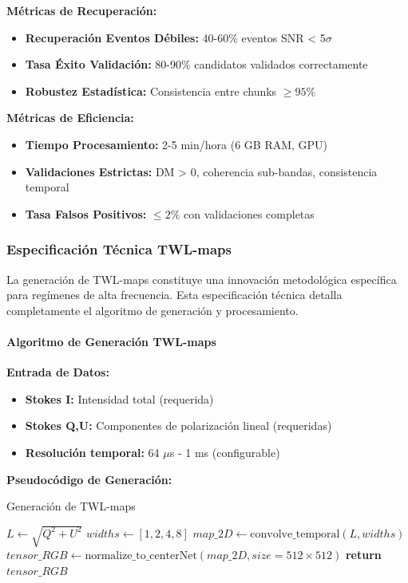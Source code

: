 \textbf{Métricas de Recuperación:}
\begin{itemize}
\item \textbf{Recuperación Eventos Débiles:} 40-60\% eventos SNR < 5$\sigma$
\item \textbf{Tasa Éxito Validación:} 80-90\% candidatos validados correctamente
\item \textbf{Robustez Estadística:} Consistencia entre chunks $\geq 95\%$
\end{itemize}

\textbf{Métricas de Eficiencia:}
\begin{itemize}
\item \textbf{Tiempo Procesamiento:} 2-5 min/hora (6 GB RAM, GPU)
\item \textbf{Validaciones Estrictas:} DM > 0, coherencia sub-bandas, consistencia temporal
\item \textbf{Tasa Falsos Positivos:} $\leq 2\%$ con validaciones completas
\end{itemize}

\subsubsection{Especificación Técnica TWL-maps}

La generación de TWL-maps constituye una innovación metodológica específica para regímenes de alta frecuencia. Esta especificación técnica detalla completamente el algoritmo de generación y procesamiento.

\paragraph{Algoritmo de Generación TWL-maps}

\textbf{Entrada de Datos:}
\begin{itemize}
\item \textbf{Stokes I:} Intensidad total (requerida)
\item \textbf{Stokes Q,U:} Componentes de polarización lineal (requeridas)
\item \textbf{Resolución temporal:} 64 $\mu$s - 1 ms (configurable)
\end{itemize}

\textbf{Pseudocódigo de Generación:}

\begin{algorithm}[H]
\caption{Generación de TWL-maps}
\begin{algorithmic}[1]
    \State $L \leftarrow \sqrt{Q^2 + U^2}$ 
    \State $widths \leftarrow [1, 2, 4, 8]$ 
    \State $map\_2D \leftarrow \text{convolve\_temporal}(L, widths)$
    \State $tensor\_RGB \leftarrow \text{normalize\_to\_centerNet}(map\_2D, size=512\times512)$
    \State \textbf{return} $tensor\_RGB$
\EndFunction
\end{algorithmic}
\end{algorithm}


